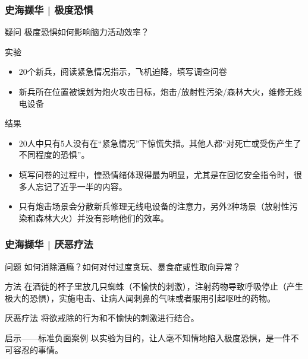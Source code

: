 \begin{frame}
  \frametitle{史海撷华 | 极度恐惧}
  \begin{block}{疑问}
    极度恐惧如何影响脑力活动效率？
  \end{block}
  \vspace{-0.3em}
  \pause
  \begin{block}{实验}
    \begin{itemize}
      \item 20个新兵，阅读紧急情况指示，飞机迫降，填写调查问卷
      \item 新兵所在位置被误划为炮火攻击目标，炮击/放射性污染/森林大火，维修无线电设备
    \end{itemize}
  \end{block}
  \vspace{-0.3em}
  \pause
  \begin{block}{结果}
    \begin{itemize}
      \item 20人中只有5人没有在“紧急情况”下惊慌失措。其他人都“对死亡或受伤产生了不同程度的恐惧”。
      \item 填写问卷的过程中，惶恐情绪体现得最为明显，尤其是在回忆安全指令时，很多人忘记了近乎一半的内容。
      \item 只有炮击场景会分散新兵修理无线电设备的注意力，另外2种场景（放射性污染和森林大火）并没有影响他们的效率。
    \end{itemize}
  \end{block}
\end{frame}

\begin{frame}
  \frametitle{史海撷华 | 厌恶疗法}
  \begin{block}{问题}
    如何消除酒瘾？如何对付过度贪玩、暴食症或性取向异常？
  \end{block}
  \pause
  \begin{block}{方法}
在酒徒的杯子里放几只蜘蛛（不愉快的刺激），注射药物导致呼吸停止（产生极大的恐惧），实施电击、让病人闻刺鼻的气味或者服用引起呕吐的药物。
  \end{block}
  \pause
  \begin{block}{厌恶疗法}
    将欲戒除的行为和不愉快的刺激进行结合。
  \end{block}
  \pause
  \begin{block}{启示——标准负面案例}
    以实验为目的，让人毫不知情地陷入极度恐惧，是一件不可容忍的事情。
  \end{block}
\end{frame}

